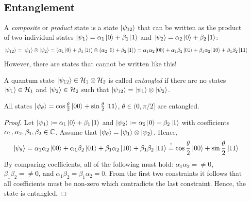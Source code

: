		\subsection{Entanglement}
			A \emph{composite} or \emph{product} state is a state \(\ket{\psi_{12}}\) that can be written as the product of two individual states \( \ket{\psi_1} = \alpha_1 \ket{0} + \beta_1 \ket{1} \) and \( \ket{\psi_2} = \alpha_2 \ket{0} + \beta_2 \ket{1} \):
			\begin{equation}
				\ket{\psi_{12}}
					= \ket{\psi_1} \otimes \ket{\psi_2}
					= (\alpha_1 \ket{0} + \beta_1 \ket{1}) \otimes (\alpha_2 \ket{0} + \beta_2 \ket{1})
					= \alpha_1 \alpha_2 \ket{00} + \alpha_1 \beta_2 \ket{01} + \beta_1 \alpha_2 \ket{10} + \beta_1 \beta_2 \ket{11}
			\end{equation}
			However, there are states that cannot be written like this!

			\begin{definition}
				A quantum state \( \ket{\psi_{12}} \in \mathcal{H}_1 \otimes \mathcal{H}_2 \) is called \emph{entangled} if there are no states \( \ket{\psi_1} \in \mathcal{H}_1 \) and \( \ket{\psi_2} \in \mathcal{H}_2 \) such that \( \ket{\psi_{12}} = \ket{\psi_1} \otimes \ket{\psi_2} \).
			\end{definition}

			\begin{theorem}
				All states \( \ket{\psi_\theta} = \cos\frac{\theta}{2} \ket{00} + \sin\frac{\theta}{2} \ket{11} \), \( \theta \in (0, \pi/2] \) are entangled.
			\end{theorem}
			\begin{proof}
				Let \( \ket{\psi_1} \coloneqq \alpha_1 \ket{0} + \beta_1 \ket{1} \) and \( \ket{\psi_2} \coloneqq \alpha_2 \ket{0} + \beta_2 \ket{1} \) with coefficients \( \alpha_1, \alpha_2, \beta_1, \beta_2 \in \mathbb{C} \). Assume that \( \ket{\psi_\theta} = \ket{\psi_1} \otimes \ket{\psi_2} \). Hence,
				\begin{equation}
					\ket{\psi_\theta}
						= \alpha_1 \alpha_2 \ket{00} + \alpha_1 \beta_2 \ket{01} + \beta_1 \alpha_2 \ket{10} + \beta_1 \beta_2 \ket{11}
						\overset{!}{=} \cos\frac{\theta}{2} \ket{00} + \sin\frac{\theta}{2} \ket{11}
				\end{equation}
				By comparing coefficients, all of the following must hold: \( \alpha_1 \alpha_2 = \neq 0 \), \( \beta_1 \beta_2 = \neq 0 \), and \( \alpha_1 \beta_2 = \beta_1 \alpha_2 = 0 \). From the first two constraints it follows that all coefficients must be non-zero which contradicts the last constraint. Hence, the state is entangled.
			\end{proof}

